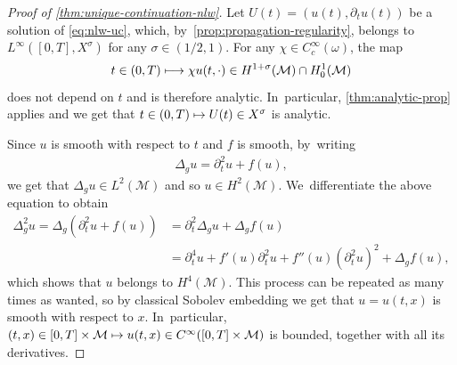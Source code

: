 \documentclass[10pt]{amsart}
\newcommand\mto{\mathchoice{\longmapsto}{\mapsto}{\mapsto}{\mapsto}}
\theoremstyle{definition}
\let\mc\mathcal
\newcommand{\M}{\mc{M}}
\begin{document}
\begin{proof}[Proof of \cref{thm:unique-continuation-nlw}] Let $U(t)=(u(t), \partial_t u(t))$ be a solution of \eqref{eq:nlw-uc}, which, by~\cref{prop:propagation-regularity}, belongs to $L^\infty([0, T], X^\sigma)$ for any $\sigma\in (1/2, 1)$. For any $\chi\in C^{\infty}_c(\omega) $, the map
\[
t\in (0, T)\mto \chi u(t,\cdot)\in H^{1+\sigma}(\M)\cap H_0^1(\M)
\]
does not depend on $t$ and is therefore analytic. In~particular, \cref{thm:analytic-prop} applies and we get that $t\in (0, T)\mto U(t)\in X^\sigma$ is analytic.

Since $u$ is smooth with respect to $t$ and $f$ is smooth, by~writing
\begin{align*}
\Delta_g u=\partial_t^2 u+f(u),
\end{align*}
we get that $\Delta_g u\in L^2(\M)$ and so $u\in H^2(\M)$. We~differentiate the above equation to obtain
\begin{align*}
\Delta_g^2 u= \Delta_g (\partial_t^2 u+f(u))&=\partial_t^2 \Delta_g u+\Delta_g f(u)\\
&=\partial_t^4 u+f'(u)\partial_t^2 u+f''(u)(\partial_t^2 u)^2+\Delta_g f(u),
\end{align*}
which shows that $u$ belongs to $H^4(\M)$. This process can be repeated as many times as wanted, so by classical Sobolev embedding we get that $u=u(t, x)$ is smooth with respect to $x$. In~particular, $(t, x)\in [0, T]\times \M\mto u(t, x)\in C^\infty([0, T]\times \M)$ is bounded, together with all its derivatives.


\end{proof}
\end{document}

